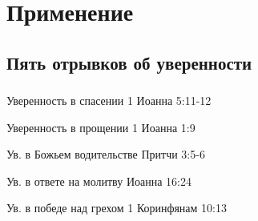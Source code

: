 \documentclass[t,aspectratio=169,14pt]{beamer}  %
\begin{document}
\section{Применение}
\subsection{Пять отрывков об уверенности}
\begin{frame}[c]
	\frametitle{\insertsection}
	\framesubtitle{\insertsubsection}
	\begin{multicols}{2}
	\begin{exampleblock}{Уверенность в спасении}\setlength{\textwidth}{0.4\textwidth}
		1 Иоанна 5:11-12
	\end{exampleblock}
	\begin{exampleblock}{Уверенность в прощении}
		1 Иоанна 1:9
	\end{exampleblock}
	\begin{exampleblock}{Ув. в Божьем водительстве}
		Притчи 3:5-6
	\end{exampleblock}	
	\begin{exampleblock}{Ув. в ответе на молитву}
		Иоанна 16:24
	\end{exampleblock}	
	\begin{exampleblock}{Ув. в победе над грехом}
		1 Коринфянам 10:13
	\end{exampleblock}

	\end{multicols}		
\end{frame}
\end{document}
